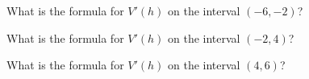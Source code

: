 \documentclass{ximera}
\begin{document}
\begin{exercise}
\begin{question}


What is the formula for $V'(h)$ on the interval $(-6, -2)$?

\begin{multipleChoice}
\end{multipleChoice}



\end{question}









\begin{question}


What is the formula for $V'(h)$ on the interval $(-2, 4)$?

\begin{multipleChoice}
\end{multipleChoice}



\end{question}









\begin{question}


What is the formula for $V'(h)$ on the interval $(4, 6)$?

\begin{multipleChoice}
\end{multipleChoice}



\end{question}








\end{exercise}
\end{document}
